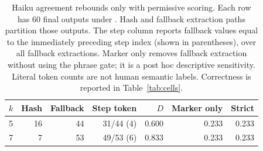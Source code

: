 \begin{table}[t]
\centering
\small
\caption{Haiku agreement rebounds only with permissive scoring. Each row has 60 final outputs under \dropq. Hash and fallback extraction paths partition those outputs. The step column reports fallback values equal to the immediately preceding step index (shown in parentheses), over all fallback extractions. Marker only removes fallback extraction without using the phrase gate; it is a post hoc descriptive sensitivity. Literal token counts are not human semantic labels. Correctness is reported in Table~\ref{tab:cells}.}
\label{tab:parser}
\begin{tabular}{@{}rrrrrrr@{}}
\toprule
$k$ & Hash & Fallback & Step token & $D$ & Marker only & Strict \\
\midrule
5 & 16 & 44 & 31/44 (4) & 0.600 & 0.233 & 0.233 \\
7 & 7 & 53 & 49/53 (6) & 0.833 & 0.233 & 0.233 \\
\bottomrule
\end{tabular}
\end{table}

